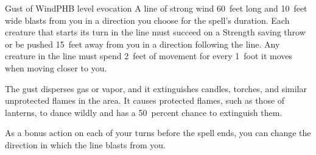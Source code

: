 \begin{spell}{Gust of Wind}{PHB}{ level evocation}
{
}
A line of strong wind 60~feet long and 10~feet wide
blasts from you in a direction you choose for the spell's
duration. Each creature that starts its turn in the line
must succeed on a Strength saving throw or be pushed
15~feet away from you in a direction following the line.
Any creature in the line must spend 2~feet of
movement for every 1~foot it moves when moving
closer to you.

The gust disperses gas or vapor, and it extinguishes
candles, torches, and similar unprotected flames in
the area. It causes protected flames, such as those of
lanterns, to dance wildly and has a 50~percent chance to
extinguish them.

As a bonus action on each of your turns before the
spell ends, you can change the direction in which the
line blasts from you.
\end{spell}